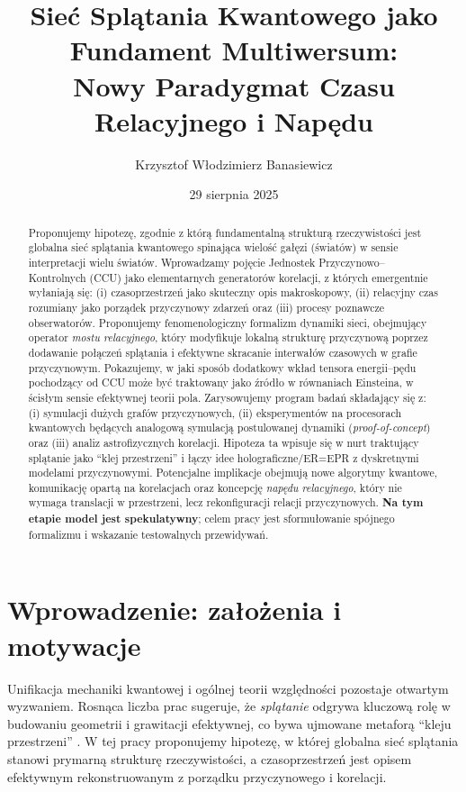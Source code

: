 \documentclass[11pt,a4paper]{article}
\title{\textbf{Sieć Splątania Kwantowego jako Fundament Multiwersum:\\
Nowy Paradygmat Czasu Relacyjnego i Napędu}}
\author[1]{Krzysztof W\l{}odzimierz Banasiewicz}
\affil[1]{\small Independent Researcher, The Hague, Netherlands}
\date{29 sierpnia 2025}
\begin{document}
\maketitle

\begin{abstract}
\noindent
Proponujemy hipotezę, zgodnie z którą fundamentalną strukturą rzeczywistości jest globalna sieć splątania kwantowego spinająca wielość gałęzi (światów) w sensie interpretacji wielu światów. Wprowadzamy pojęcie Jednostek Przyczynowo--Kontrolnych (CCU) jako elementarnych generatorów korelacji, z których emergentnie wyłaniają się: (i) czasoprzestrzeń jako skuteczny opis makroskopowy, (ii) relacyjny czas rozumiany jako porządek przyczynowy zdarzeń oraz (iii) procesy poznawcze obserwatorów. Proponujemy fenomenologiczny formalizm dynamiki sieci, obejmujący operator \emph{mostu relacyjnego}, który modyfikuje lokalną strukturę przyczynową poprzez dodawanie połączeń splątania i efektywne skracanie interwałów czasowych w grafie przyczynowym. Pokazujemy, w jaki sposób dodatkowy wkład tensora energii--pędu pochodzący od CCU może być traktowany jako źródło w równaniach Einsteina, w ścisłym sensie efektywnej teorii pola. Zarysowujemy program badań składający się z: (i) symulacji dużych grafów przyczynowych, (ii) eksperymentów na procesorach kwantowych będących analogową symulacją postulowanej dynamiki (\emph{proof-of-concept}) oraz (iii) analiz astrofizycznych korelacji. Hipoteza ta wpisuje się w nurt traktujący splątanie jako ``klej przestrzeni'' i łączy idee holograficzne/ER=EPR z dyskretnymi modelami przyczynowymi. Potencjalne implikacje obejmują nowe algorytmy kwantowe, komunikację opartą na korelacjach oraz koncepcję \emph{napędu relacyjnego}, który nie wymaga translacji w przestrzeni, lecz rekonfiguracji relacji przyczynowych. \textbf{Na tym etapie model jest spekulatywny}; celem pracy jest sformułowanie spójnego formalizmu i wskazanie testowalnych przewidywań. %
\end{abstract}

\section{Wprowadzenie: zało\.zenia i motywacje}
Unifikacja mechaniki kwantowej i ogólnej teorii względności pozostaje otwartym wyzwaniem. Rosnąca liczba prac sugeruje, że \emph{splątanie} odgrywa kluczową rolę w budowaniu geometrii i grawitacji efektywnej, co bywa ujmowane metaforą ``kleju przestrzeni'' \cite{Preskill2018,VanRaamsdonk2010,Swingle2012,MaldacenaSusskind2013}. W tej pracy proponujemy hipotezę, w której globalna sieć splątania stanowi prymarną strukturę rzeczywistości, a czasoprzestrzeń jest opisem efektywnym rekonstruowanym z porządku przyczynowego i korelacji.
\end{document}
